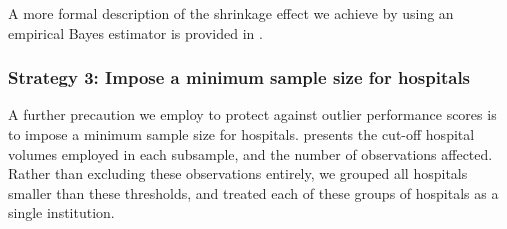 \documentclass[submission]{grattan}
\begin{document}
A more formal description of the shrinkage effect we achieve by using an empirical Bayes estimator is provided in .


\subsubsection{Strategy 3: Impose a minimum sample size for hospitals}\label{subsubsec:strategy-3-impose-a-minimum-sample-size-for-hospitals}

A further precaution we employ to protect against outlier performance scores is to impose a minimum sample size for hospitals.  presents the cut-off hospital volumes employed in each subsample, and the number of observations affected.
Rather than excluding these observations entirely, we grouped all hospitals smaller than these thresholds, and treated each of these groups of hospitals as a single institution.
\end{document}
